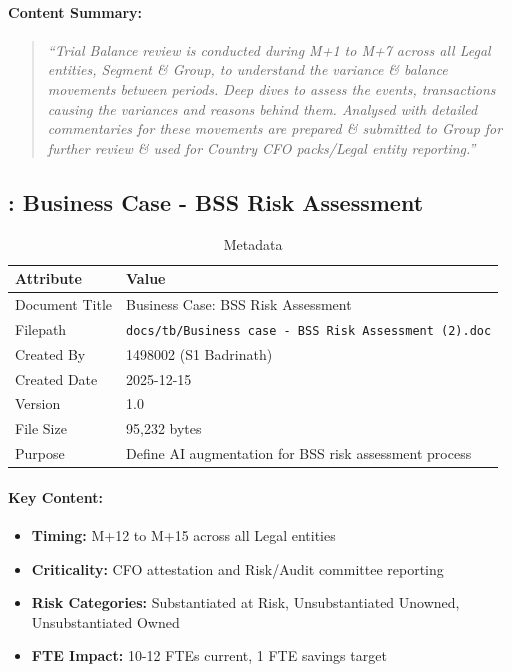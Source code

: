 \paragraph{Content Summary:}
\begin{quote}
\textit{``Trial Balance review is conducted during M+1 to M+7 across all Legal entities,
Segment \& Group, to understand the variance \& balance movements between periods.
Deep dives to assess the events, transactions causing the variances and reasons
behind them. Analysed with detailed commentaries for these movements are prepared \&
submitted to Group for further review \& used for Country CFO packs/Legal entity reporting.''}
\end{quote}

\subsection{: Business Case - BSS Risk Assessment}
\label{sec:tb-bc-002}

\begin{table}[h]
\centering
\caption{ Metadata}
\begin{tabularx}{\textwidth}{@{}L{4cm}L{10cm}@{}}
\toprule
\textbf{Attribute} & \textbf{Value} \\
\midrule
Document Title & Business Case: BSS Risk Assessment \\
Filepath & \texttt{docs/tb/Business case - BSS Risk Assessment (2).doc} \\
Created By & 1498002 (S1 Badrinath) \\
Created Date & 2025-12-15 \\
Version & 1.0 \\
File Size & 95,232 bytes \\
Purpose & Define AI augmentation for BSS risk assessment process \\
\bottomrule
\end{tabularx}
\end{table}

\paragraph{Key Content:}
\begin{itemize}[noitemsep]
  \item \textbf{Timing:} M+12 to M+15 across all Legal entities
  \item \textbf{Criticality:} CFO attestation and Risk/Audit committee reporting
  \item \textbf{Risk Categories:} Substantiated at Risk, Unsubstantiated Unowned, Unsubstantiated Owned
  \item \textbf{FTE Impact:} 10-12 FTEs current, 1 FTE savings target
\end{itemize}

